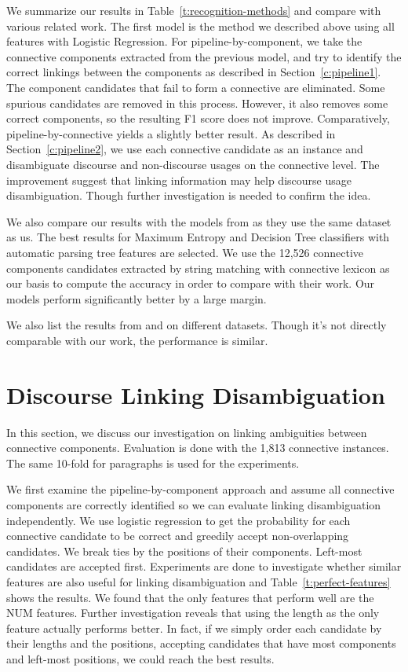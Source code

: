 

We summarize our results in Table~\ref{t:recognition-methods} and
compare with various related work. The first model is the method we described above
using all features with Logistic Regression. For pipeline-by-component,
we take the connective components extracted from the previous model, and try to
identify the correct linkings between the components as described in Section~\ref{c:pipeline1}.
The component candidates that fail to form a connective are eliminated.
Some spurious candidates are removed in this process. However, it also removes some
correct components, so the resulting F1 score does not improve. Comparatively,
pipeline-by-connective yields a slightly better result. As described in
Section~\ref{c:pipeline2}, we use each connective candidate as an instance and
disambiguate discourse and non-discourse usages on the connective level.
The improvement suggest that linking information may help discourse usage disambiguation.
Though further investigation is needed to confirm the idea.

We also compare our results with the models from \cite{li2015automatic} as they use the
same dataset as us. The best results for Maximum Entropy and Decision Tree classifiers with
automatic parsing tree features are selected. We use the 12,526 connective components candidates
extracted by string matching with connective lexicon as our basis to compute the accuracy in order
to compare with their work. Our models perform significantly better by a large margin.

We also list the results from \cite{zhou2012cross} and \cite{li2014cross} on different
datasets. Though it's not directly comparable with our work, the performance is similar.



\section{Discourse Linking Disambiguation}

In this section, we discuss our investigation on linking ambiguities between connective components. Evaluation is done with the 1,813 connective instances. The same 10-fold
for paragraphs is used for the experiments.

We first examine the pipeline-by-component approach and assume all connective
components are correctly identified so we can evaluate linking disambiguation
independently. We use logistic regression
to get the probability for each connective candidate to be correct and greedily
accept non-overlapping candidates. We break ties by the positions of their components.
Left-most candidates are accepted first. Experiments are done to investigate whether
similar features are also useful for linking disambiguation and 
Table~\ref{t:perfect-features} shows the results. We found that
the only features that perform well are the NUM features. Further investigation
reveals that using the length as the only feature actually performs better.
In fact, if we simply order each candidate by their lengths and the positions,
accepting candidates that have most components and left-most positions, we could
reach the best results.


